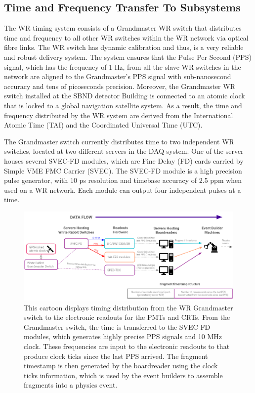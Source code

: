 \subsection{Time and Frequency Transfer To Subsystems}
\label{section5.2.1}

The WR timing system consists of a Grandmaster WR switch that distributes time and frequency to all other WR switches within the WR network via optical fibre links.
The WR switch has dynamic calibration and thus, is a very reliable and robust delivery system.
The system ensures that the Pulse Per Second (PPS) signal, which has the frequency of 1 Hz, from all the slave WR switches in the network are aligned to the Grandmaster's PPS signal with sub-nanosecond accuracy and tens of picoseconds precision. 
Moreover, the Grandmaster WR switch installed at the SBND detector Building is connected to an atomic clock that is locked to a global navigation satellite system. 
As a result, the time and frequency distributed by the WR system are derived from the International Atomic Time (TAI) and the Coordinated Universal Time (UTC).

The Grandmaster switch currently distributes time to two independent WR switches, located at two different servers in the DAQ system.
One of the server houses several SVEC-FD modules, which are Fine Delay (FD) cards carried by Simple VME FMC Carrier (SVEC).
The SVEC-FD module is a high precision pulse generator, with 10 ps resolution and timebase accuracy of 2.5 ppm when used on a WR network.
Each module can output four independent pulses at a time.

\begin{figure}[htbp!] 
\centering    
\includegraphics[width=1.0\textwidth]{time_transfer}
\caption[time_transfer]{
This cartoon displays timing distribution from the WR Grandmaster switch to the electronic readouts for the PMTs and CRTs.
From the Grandmaster switch, the time is transferred to the SVEC-FD modules, which generates highly precise PPS signals and 10 MHz clock.
These frequencies are input to the electronic readouts to that produce clock ticks since the last PPS arrived.
The fragment timestamp is then generated by the boardreader using the clock ticks information, which is used by the event builders to assemble fragments into a physics event.
}
\label{fig:time_transfer}
\end{figure}


